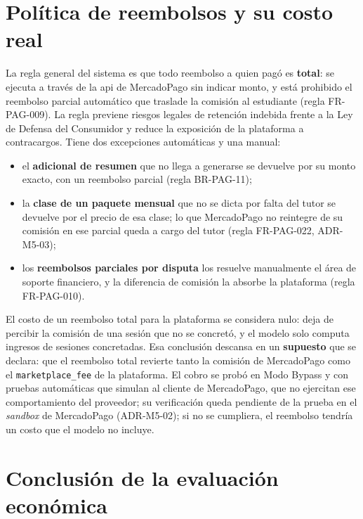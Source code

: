 \section{Política de reembolsos y su costo real}\label{sec:reembolsos}

La regla general del sistema es que todo reembolso a quien pagó es
\textbf{total}: se ejecuta a través de la \gls{api} de MercadoPago sin
indicar monto, y está prohibido el reembolso parcial automático que
traslade la comisión al estudiante (regla FR-PAG-009). La regla previene
riesgos legales de retención indebida frente a la Ley de Defensa del
Consumidor y reduce la exposición de la plataforma a contracargos. Tiene
dos excepciones automáticas y una manual:

\begin{itemize}
    \item el \textbf{adicional de resumen} que no llega a generarse se
          devuelve por su monto exacto, con un reembolso parcial (regla
          BR-PAG-11);
    \item la \textbf{clase de un paquete mensual} que no se dicta por
          falta del tutor se devuelve por el precio de esa clase; lo que
          MercadoPago no reintegre de su comisión en ese parcial queda a
          cargo del tutor (regla FR-PAG-022, ADR-M5-03);
    \item los \textbf{reembolsos parciales por disputa} los resuelve
          manualmente el área de soporte financiero, y la diferencia de
          comisión la absorbe la plataforma (regla FR-PAG-010).
\end{itemize}

El costo de un reembolso total para la plataforma se considera nulo: deja
de percibir la comisión de una sesión que no se concretó, y el modelo solo
computa ingresos de sesiones concretadas. Esa conclusión descansa en un
\textbf{supuesto} que se declara: que el reembolso total revierte tanto
la comisión de MercadoPago como el \texttt{marketplace\_fee} de la
plataforma. El cobro se probó en Modo Bypass y con pruebas automáticas que
simulan al cliente de MercadoPago, que no ejercitan ese comportamiento
del proveedor; su verificación queda pendiente de la prueba en el
\emph{sandbox} de MercadoPago (ADR-M5-02); si no se cumpliera, el reembolso
tendría un costo que el modelo no incluye.

\section{Conclusión de la evaluación económica}

